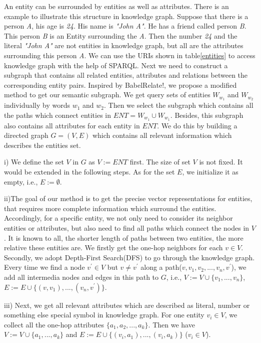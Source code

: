 
An entity can be surrounded by entities as well as attributes. There is an example to illustrate this structure
in knowledge graph. Suppose that there is a person \emph{A}, his age is \emph{24}. His name is \emph{"John A"}.
He has a friend called person \emph{B}. This person \emph{B} is an Entity surrounding the \emph{A}.
Then the number \emph{24} and the literal \emph{"John A"} are not entities in knowledge graph,
but all are the attributes surrounding this person \emph{A}.
We can use the URIs shown in table\ref{entities} to access knowledge graph with the help of SPARQL. Next we need to construct a subgraph 
that contains all related entities, attributes and relations between the corresponding entity pairs. Inspired by BabelRelate!\cite{aaai/NavigliP12},
we propose a modified method to get our semantic subgraph. We get query sets of entities $W_{w_1}$ and $W_{w_2}$ individually
by words $w_1$ and $w_2$. Then we select the subgraph which contains all the paths which connect entities in
$ENT = W_{w_1} \cup W_{w_1}$. Besides, this subgraph also contains all attributes for each entity in $ENT$. We do 
this by building a directed graph ${G = (V, E)}$ which contains all relevant information which describes
the entities set.

i) We define the set $V$ in $G$ as $V:=ENT$ first. 
The size of set $V$ is not fixed. It would be extended in the following steps.
As for the set $E$, we initialize it as empty, i.e., $E:=\emptyset$.

ii)The goal of our method is to get the precise vector representations for entities,
that requires more complete information which surround the entities.
Accordingly, for a specific entity, we not only need to consider its neighbor entities or attributes, but also
need to find all paths which connect the nodes in $V$. 
It is known to all, the shorter length of paths between two entities, the more relative these entities are.
We firstly get the one-hop neighbors for each $v \in V$. 
Secondly, we adopt Depth-First Search(DFS) to go through the knowledge graph. Every time we find a node
$v^{'} \in V$ but $v \ne v^{'}$ along a path($v, v_1, v_2,...,v_n, v^{'}$), we add all intermedia 
nodes and edges in this path to $G$, i.e., $V:=V \cup \{v_1, ..., v_n\}$, 
$E:=E \cup \{(v, v_1), ..., (v_n, v^{'})\}$.

iii) Next, we get all relevant attributes which are described as literal, number or something 
else special symbol in knowledge graph. For one entity $v_i \in V$, we collect all the one-hop attributes 
$\{a_1, a_2, ..., a_k\}$. Then we have $V:=V \cup \{a_1, ..., a_k\}$ and
$E:=E \cup \{(v_i, a_1), ..., (v_i, a_k)\}$ ($v_i \in V$).

